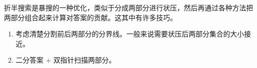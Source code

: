 \documentclass[E:/GsjzTle/main/main.tex]{subfiles}
\begin{document}
折半搜索是暴搜的一种优化，类似于分成两部分进行状压，然后再通过各种方法把两部分组合起来计算对答案的贡献。这其中有许多技巧。

\begin{enumerate}
\item  考虑清楚分割前后两部分的分界线。一般来说需要状压后两部分集合的大小接近。

\item  二分答案 + 双指针扫描两部分。
\end{enumerate}
\end{document}
